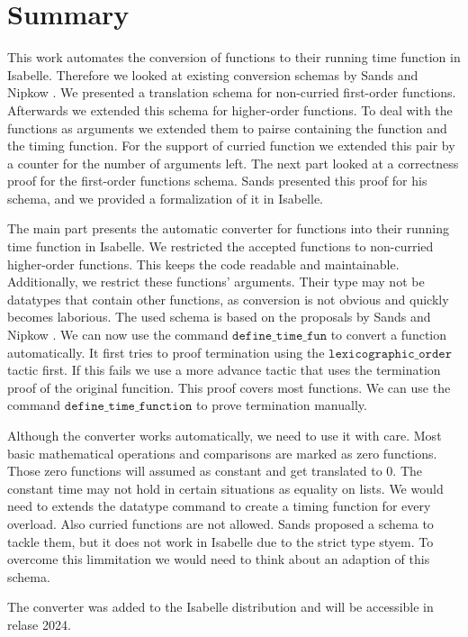 
\chapter{Summary}\label{chapter:summary}

This work automates the conversion of functions to their running time function in Isabelle.
Therefore we looked at existing conversion schemas by Sands \parencite{sands} and Nipkow \parencite{fds}.
We presented a translation schema for non-curried first-order functions.
Afterwards we extended this schema for higher-order functions.
To deal with the functions as arguments we extended them to pairse containing the function and the timing function.
For the support of curried function we extended this pair by a counter for the number of arguments left.
The next part looked at a correctness proof for the first-order functions schema.
Sands presented this proof for his schema, and we provided a formalization of it in Isabelle.

The main part presents the automatic converter for functions into their running time function in Isabelle.
We restricted the accepted functions to non-curried higher-order functions.
This keeps the code readable and maintainable.
Additionally, we restrict these functions' arguments.
Their type may not be datatypes that contain other functions, as conversion is not obvious and quickly becomes laborious.
The used schema is based on the proposals by Sands \parencite{sands} and Nipkow \parencite{fds}.
We can now use the command $\texttt{define\_time\_fun}$ to convert a function automatically.
It first tries to proof termination using the $\texttt{lexicographic\_order}$ tactic first.
If this fails we use a more advance tactic that uses the termination proof of the original funcition.
This proof covers most functions.
We can use the command $\texttt{define\_time\_function}$ to prove termination manually.

Although the converter works automatically, we need to use it with care.
Most basic mathematical operations and comparisons are marked as zero functions.
Those zero functions will assumed as constant and get translated to $0$.
The constant time may not hold in certain situations as equality on lists.
We would need to extends the datatype command to create a timing function for every overload.
Also curried functions are not allowed.
Sands proposed a schema to tackle them, but it does not work in Isabelle due to the strict type styem.
To overcome this limmitation we would need to think about an adaption of this schema.

The converter was added to the Isabelle distribution and will be accessible in relase 2024.
